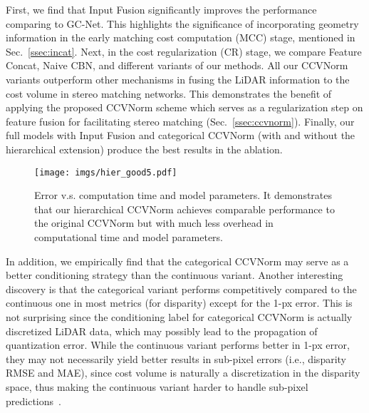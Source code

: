 \documentclass[letterpaper, 10 pt, conference]{ieeeconf}
\newcommand{\modelNameIncat}{Input Fusion }
\newcommand{\modelNameCBN}{CCVNorm }
\newcommand{\secref}{Sec.~\ref}
\begin{document}
{{{}
First, we find that \modelNameIncat significantly improves the performance comparing to GC-Net. 
This highlights the significance of incorporating geometry information in the early matching cost computation (MCC) stage, mentioned in \secref{ssec:incat}. 
Next, in the cost regularization (CR) stage, we compare Feature Concat, Naive CBN, and different variants of our methods. 
All our \modelNameCBN variants outperform other mechanisms in fusing the LiDAR information to the cost volume in stereo matching networks.
This demonstrates the benefit of applying the proposed \modelNameCBN scheme which serves as a regularization step on feature fusion for facilitating stereo matching (\secref{ssec:ccvnorm}).
Finally, our full models with \modelNameIncat and categorical \modelNameCBN (with and without the hierarchical extension) produce the best results in the ablation.


\begin{figure}[t!]
\centering
\texttt{[image: imgs/hier\_good5.pdf]}
\caption{\small{Error v.s. computation time and model parameters. It demonstrates that our hierarchical \modelNameCBN achieves comparable performance to the original \modelNameCBN but with much less overhead in computational time and model parameters.}}
\label{fig:hier-good}
\end{figure}

{}
In addition, we empirically find that the categorical \modelNameCBN may serve as a better conditioning strategy than the continuous variant.
Another interesting discovery is that the categorical variant performs competitively compared to the continuous one in most metrics (for disparity) except for the 1-px error. This is not surprising since the conditioning label for categorical \modelNameCBN is actually discretized LiDAR data, which may possibly lead to the propagation of quantization error. 
While the continuous variant performs better in 1-px error, they may not necessarily yield better results in sub-pixel errors (i.e., disparity RMSE and MAE), since cost volume is naturally a discretization in the disparity space, thus making the continuous variant harder to handle sub-pixel predictions~\cite{stereogcnet}.


}}
\end{document}
